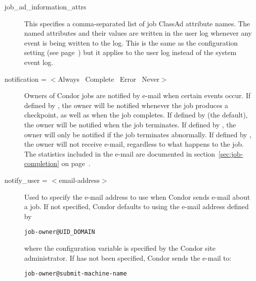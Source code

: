 \begin{description}

\label{man-condor-submit-job-ad-information-attrs}
\item[job\_ad\_information\_attrs]
This specifies a comma-separated list of job ClassAd attribute names.
The named attributes and their values are written in the user log
whenever any event is being written to the log.
This is the same as the configuration setting
 (see
page~\pageref{param:EventLogJobAdInformationAttrs}) but it applies to
the user log instead of the system event log.


\label{man-condor-submit-notification}
\item[notification = $<$Always \Bar\ Complete \Bar\ Error \Bar\ Never$>$]
Owners of Condor jobs are notified by
e-mail when certain events occur.
If defined by , the owner will be notified
whenever the job produces a checkpoint, as well as when the job completes.
If defined by  (the default), the owner will
be notified when the job terminates.
If defined by , the owner will only be notified
if the job terminates abnormally.
If defined by , the owner will not receive e-mail,
regardless to what happens to the job.
The statistics included in the e-mail are documented in
section~\ref{sec:job-completion} on
page~\pageref{sec:job-completion}.


\item[notify\_user = $<$email-address$>$]
\label{man-condor-submit-notify-user}
Used to specify the e-mail
address to use when Condor sends e-mail about a job.  If not specified,
Condor defaults to using the e-mail address defined by
\begin{verbatim}
job-owner@UID_DOMAIN
\end{verbatim}
where the configuration variable 
is specified by the Condor site administrator.
If  has not been specified,
Condor sends the e-mail to:
\begin{verbatim}
job-owner@submit-machine-name
\end{verbatim}



\end{description}
